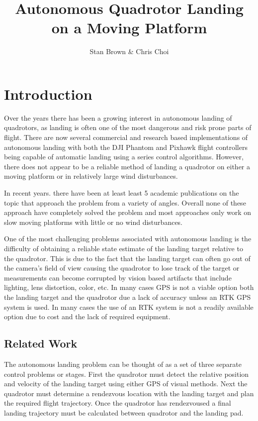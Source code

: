 \documentclass[11pt, twocolumn]{article}
\begin{document}
\raggedbottom

\title{Autonomous Quadrotor Landing on a Moving Platform}
\author{Stan Brown \& Chris Choi}
\date{}
\maketitle

\section{Introduction}
Over the years there has been a growing interest in autonomous landing of quadrotors, as landing is often one of the most dangerous and risk prone parts of flight. There are now several commercial and research based implementations of autonomous landing with both the DJI Phantom and Pixhawk flight controllers being capable of automatic landing using a series control algorithms. However, there does not appear to be a reliable method of landing a quadrotor on either a moving platform or in relatively large wind disturbances. 

In recent years. there have been at least least 5 academic publications on the topic \cite{Lee2012, Kim2014, Voos2010, Friis2009, Ling2014, Herisse2012} that approach the problem from a variety of angles. Overall none of these approach have completely solved the problem and most approaches only work on slow moving platforms with little or no wind disturbances. 

One of the most challenging problems associated with autonomous landing is the difficulty of obtaining a reliable state estimate of the landing target relative to the quadrotor. This is due to the fact that the landing target can often go out of the camera's field of view causing the quadrotor to lose track of the target or measurements can become corrupted by vision based artifacts that include lighting, lens distortion, color, etc. In many cases GPS is not a viable option both the landing target and the quadrotor due a lack of accuracy unless an RTK GPS system is used. In many cases the use of an RTK system is not a readily available option due to cost and the lack of required equipment. 

\subsection{Related Work}
The autonomous landing problem can be thought of as a set of three separate control problems or stages. First the quadrotor must detect the relative position and velocity of the landing target using either GPS of visual methods. Next the quadrotor must determine a rendezvous location with the landing target and plan the required flight trajectory. Once the quadrotor has rendezvoused a final landing trajectory must be calculated between quadrotor and the landing pad. 
\end{document}
